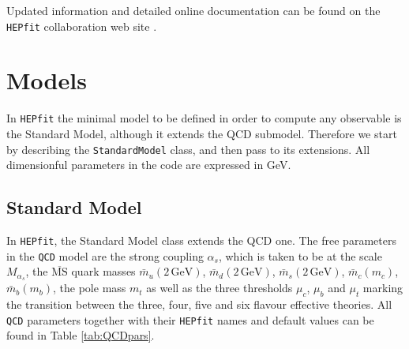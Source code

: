\documentclass[preprint,3p,12pt]{elsarticle}
\newcommand{\HEPfit}{\texttt{HEPfit}\xspace}
\begin{document}
Updated information and detailed online documentation can be found on the
\HEPfit collaboration web site \cite{website}.




\section{Models}
\label{sec:Models}

In \HEPfit the minimal model to be defined in order to compute any observable is the Standard Model, although it extends the QCD submodel. Therefore we start by describing the \texttt{StandardModel} class, and then pass to its extensions. 
All dimensionful parameters in the code are expressed in GeV. 

\subsection{Standard Model}
\label{sec:SM}

In \HEPfit, the Standard Model class extends the QCD one. The free parameters in the \texttt{QCD} model are the strong coupling $\alpha_s$, which is taken to be at the scale $M_{\alpha_s}$, the $\overline{\mathrm{MS}}$ quark masses $\bar{m}_u(2\,\mathrm{GeV})$, $\bar{m}_d(2\,\mathrm{GeV})$, $\bar m_s(2\,\mathrm{GeV})$, $\bar m_c(m_c)$, $\bar m_b(m_b)$, the pole mass $m_t$ as well as the three thresholds $\mu_c$, $\mu_b$ and $\mu_t$ marking the transition between the three, four, five and six flavour effective theories. All \texttt{QCD} parameters together with their \HEPfit names and default values can be found in Table \ref{tab:QCDpars}.
\end{document}
